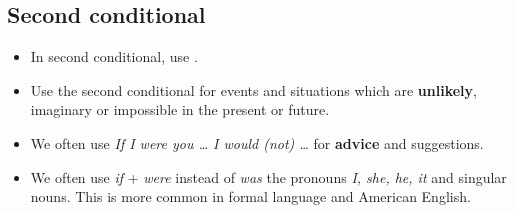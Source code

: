 \subsection{Second conditional}
\begin{itemize}
    \item In second conditional, use .
    \item Use the second conditional for events and situations
    which are \textbf{unlikely}, imaginary or impossible in the present or future.
    \item We often use \textit{If I were you \ldots{} I would (not) \ldots} for \textbf{advice} and suggestions.
    \item We often use \textit{if} + \textit{were} instead of \textit{was}
     the pronouns \textit{I, she, he, it} and singular nouns.
    This is more common in formal language and American English.
\end{itemize}